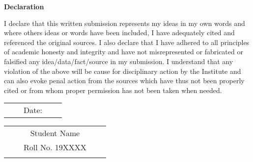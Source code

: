 \clearpage
\thispagestyle{empty}

\begin{center}
\Large  {\bf Declaration }
\end{center}
\vspace{-6in}
I declare that this written submission represents my ideas in my own words and where others ideas or words have been included, I have adequately cited and referenced the original sources. I also declare that I have adhered to all principles of academic honesty and integrity and have not misrepresented or fabricated or falsified any idea/data/fact/source in my submission. I understand that any violation of the above will be cause for disciplinary action by the Institute and can also evoke penal action from the sources which have thus not been properly cited or from whom proper permission has not been taken when needed.
\vspace{0.5in}



%
 \begin{table}[h]
 \begin{flushleft}

\vspace{-3.2in} 
 \begin{tabular}{ccccc}
 \rule[5ex]{0pt}{-10ex}&& Date: && \\ 
 \end{tabular}
\end{flushleft}

\vspace{-0.5in} 
\begin{flushright}
 \begin{tabular}{ccccc}
 
 \hline 	\rule[5ex]{0pt}{-10ex}&& Student Name&& \\ 
 \rule[5ex]{0pt}{-10ex}&& Roll No. 19XXXX&& \\ \\
 \end{tabular}
\end{flushright}
\end{table}

\pagebreak